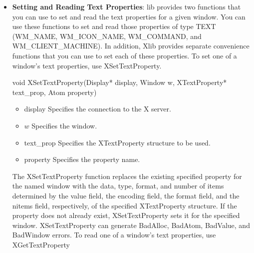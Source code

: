 \documentclass{report}
\begin{document}
\begin{itemize}
\begin{itemize}
            \bigbreak \noindent 
            Xlib provides functions to convert localized text to or from encodings that support the inter-client communication conventions for text. In addition, functions are provided for converting between lists of pointers to character strings and text properties in the STRING encoding.
            \bigbreak \noindent 
            The functions for localized text return a signed integer error status that encodes Success as zero, specific error conditions as negative numbers, and partial conversion as a count of unconvertible characters.
        \item \textbf{Setting and Reading Text Properties}: lib provides two functions that you can use to set and read the text properties for a given window. You can use these functions to set and read those properties of type TEXT (WM\_NAME, WM\_ICON\_NAME, WM\_COMMAND, and WM\_CLIENT\_MACHINE). In addition, Xlib provides separate convenience functions that you can use to set each of these properties.
            \bigbreak \noindent 
            To set one of a window’s text properties, use XSetTextProperty.
            \bigbreak \noindent 
            \begin{cppcode}
            void XSetTextProperty(Display* display, Window w, XTextProperty* text_prop, Atom property)
            \end{cppcode}
            \begin{itemize}
                \item display Specifies the connection to the X server.
                \item $w$ Specifies the window.
                \item text\_prop Specifies the XTextProperty structure to be used.
                \item property Specifies the property name.
            \end{itemize}
            The XSetTextProperty function replaces the existing specified property for the named window with the data, type, format, and number of items determined by the value field, the encoding field, the format field, and the nitems field, respectively, of the specified XTextProperty structure. If the property does not already exist, XSetTextProperty sets it for the specified window.
            \bigbreak \noindent 
            XSetTextProperty can generate BadAlloc, BadAtom, BadValue, and BadWindow errors.
            \bigbreak \noindent 
            To read one of a window’s text properties, use XGetTextProperty
            \bigbreak \noindent 

\end{itemize}
\end{itemize}
\end{document}
